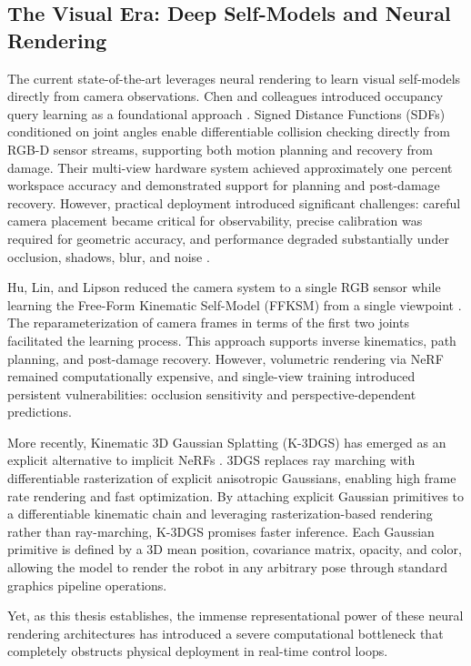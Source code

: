 ﻿\documentclass[12pt,a4paper,oneside]{report}
\begin{document}
\subsection{The Visual Era: Deep Self-Models and Neural Rendering}

The current state-of-the-art leverages neural rendering to learn visual self-models directly from camera observations. Chen and colleagues introduced occupancy query learning as a foundational approach \cite{chen2022full}. Signed Distance Functions (SDFs) conditioned on joint angles enable differentiable collision checking directly from RGB-D sensor streams, supporting both motion planning and recovery from damage. Their multi-view hardware system achieved approximately one percent workspace accuracy and demonstrated support for planning and post-damage recovery. However, practical deployment introduced significant challenges: careful camera placement became critical for observability, precise calibration was required for geometric accuracy, and performance degraded substantially under occlusion, shadows, blur, and noise \cite{chen2022full}.

Hu, Lin, and Lipson reduced the camera system to a single RGB sensor while learning the Free-Form Kinematic Self-Model (FFKSM) from a single viewpoint \cite{hu2024teaching}. The reparameterization of camera frames in terms of the first two joints facilitated the learning process. This approach supports inverse kinematics, path planning, and post-damage recovery. However, volumetric rendering via NeRF remained computationally expensive, and single-view training introduced persistent vulnerabilities: occlusion sensitivity and perspective-dependent predictions.

More recently, Kinematic 3D Gaussian Splatting (K-3DGS) has emerged as an explicit alternative to implicit NeRFs \cite{hu2025learning}. 3DGS replaces ray marching with differentiable rasterization of explicit anisotropic Gaussians, enabling high frame rate rendering and fast optimization. By attaching explicit Gaussian primitives to a differentiable kinematic chain and leveraging rasterization-based rendering rather than ray-marching, K-3DGS promises faster inference. Each Gaussian primitive is defined by a 3D mean position, covariance matrix, opacity, and color, allowing the model to render the robot in any arbitrary pose through standard graphics pipeline operations.

Yet, as this thesis establishes, the immense representational power of these neural rendering architectures has introduced a severe computational bottleneck that completely obstructs physical deployment in real-time control loops.
\end{document}

